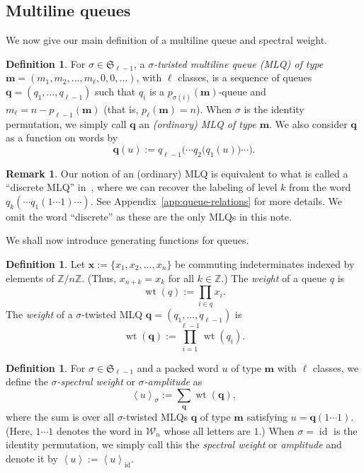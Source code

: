 \documentclass[reqno]{amsart}
\newcommand{\0}{\phantom{c}}
\newcommand{\swt}[1]{\left\langle #1 \right\rangle} %
\newcommand{\SymGp}[1]{\mathfrak{S}_{#1}} %
\DeclareMathOperator{\wt}{wt} %
\DeclareMathOperator{\id}{id} %
\newcommand{\mm}{\mathbf{m}}
\newcommand{\qq}{\mathbf{q}}
\newcommand{\xx}{\mathbf{x}}
\newcommand{\mcW}{\mathcal{W}}
\newcommand{\ZZ}{\mathbb{Z}}
\let\sumnonlimits\sum
\let\prodnonlimits\prod
\renewcommand{\sum}{\sumnonlimits\limits}
\renewcommand{\prod}{\prodnonlimits\limits}
\newcommand{\tup}[1]{\left( #1 \right)}
\newcommand{\defn}[1]{{\color{darkred}\emph{#1}}} %
\theoremstyle{plain}
\theoremstyle{definition}
\newtheorem{dfn}[thm]{Definition}
\newtheorem{remark}[thm]{Remark}
\numberwithin{equation}{section}
\begin{document}
\subsection{Multiline queues}

We now give our main definition of a multiline queue and spectral weight.

\begin{dfn}
For $\sigma \in \SymGp{\ell-1}$, a \defn{$\sigma$-twisted multiline queue (MLQ) of type $\mm = \tup{m_1, m_2, \ldots, m_\ell, 0, 0, \ldots}$}, with $\ell$ classes, is a sequence of queues $\qq = (q_1, \dotsc, q_{\ell-1})$ such that $q_i$ is a $p_{\sigma(i)}(\mm)$-queue and $m_{\ell} = n - p_{\ell-1}(\mm)$ (that is, $p_\ell(\mm) = n$).
When $\sigma$ is the identity permutation, we simply call $\qq$ an \defn{(ordinary) MLQ of type $\mm$}.
We also consider $\qq$ as a function on words by
\[
\qq(u) := q_{\ell-1}\bigl( \cdots q_2\bigl( q_1(u) \bigr) \cdots \bigr).
\]
\end{dfn}

\begin{remark}
Our notion of an (ordinary) MLQ is equivalent to what is called a ``discrete MLQ'' in~\cite[\S 2.2]{AasLin17}, where we can recover the labeling of level $k$ from the word $q_k( \cdots q_1(1 \dotsm 1) \cdots )$.
See Appendix~\ref{app:queue-relations} for more details.
We omit the word ``discrete'' as these are the only MLQs in this note.
\end{remark}

We shall now introduce generating functions for queues.

\begin{dfn}
Let $\xx := \{x_1, x_2, \ldots, x_n\}$ be commuting indeterminates indexed by elements of $\ZZ / n \ZZ$.
(Thus, $x_{n+k} = x_k$ for all $k \in \ZZ$.)
The \defn{weight} of a queue $q$ is
\[
  \wt(q) := \prod_{i \in q} x_i.
\]
The \defn{weight} of a $\sigma$-twisted MLQ $\qq = (q_1, \dotsc, q_{\ell-1})$ is
\[
  \wt(\qq) := \prod_{i=1}^{\ell-1} \wt(q_i).
\]
\end{dfn}

\begin{dfn}
For $\sigma \in \SymGp{\ell-1}$ and a packed word $u$ of type $\mm$ with $\ell$ classes, we define the \defn{$\sigma$-spectral weight} or \defn{$\sigma$-amplitude} as
\[
  \swt{u}_{\sigma} := \sum_{\qq} \wt(\qq),
\]
where the sum is over all $\sigma$-twisted MLQs $\qq$ of type $\mm$ satisfying $u = \qq(1 \dotsm 1)$.
(Here, $1 \dotsm 1$ denotes the word in $\mcW_n$ whose all letters are $1$.)
When $\sigma = \id$ is the identity permutation, we simply call this the \defn{spectral weight} or \defn{amplitude} and denote it by $\swt{u} := \swt{u}_{\id}$.
\end{dfn}
\end{document}
